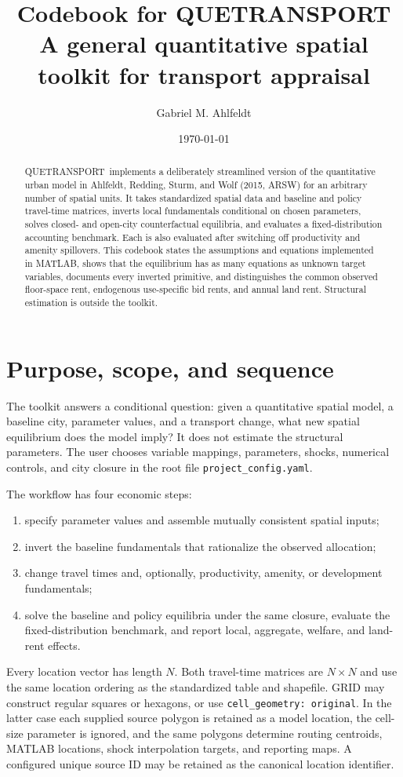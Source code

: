 \documentclass[11pt,a4paper]{article}
\title{\textbf{Codebook for QUETRANSPORT}\\
\large A general quantitative spatial toolkit for transport appraisal}
\author{Gabriel M. Ahlfeldt}
\date{\today}
\newcommand{\qt}{\textsc{QUETRANSPORT}}
\begin{document}
\maketitle
\begin{abstract}
\qt\ implements a deliberately streamlined version of the quantitative urban
model in Ahlfeldt, Redding, Sturm, and Wolf (2015, ARSW) for an arbitrary
number of spatial units. It takes standardized spatial data and baseline and
policy travel-time matrices, inverts local fundamentals conditional on chosen
parameters, solves closed- and open-city counterfactual equilibria, and
evaluates a fixed-distribution accounting benchmark. Each is also evaluated
after switching off productivity and amenity spillovers. This
codebook states the assumptions and equations implemented in MATLAB, shows
that the equilibrium has as many equations as unknown target variables,
documents every inverted primitive, and distinguishes the common observed
floor-space rent, endogenous use-specific bid rents, and annual land rent.
Structural estimation is outside the toolkit.
\end{abstract}
\tableofcontents
\newpage

\section{Purpose, scope, and sequence}
The toolkit answers a conditional question: given a quantitative spatial model,
a baseline city, parameter values, and a transport change, what new spatial
equilibrium does the model imply? It does not estimate the structural
parameters. The user chooses variable mappings, parameters, shocks, numerical
controls, and city closure in the root file \texttt{project\_config.yaml}.

The workflow has four economic steps:
\begin{enumerate}
\item specify parameter values and assemble mutually consistent spatial inputs;
\item invert the baseline fundamentals that rationalize the observed allocation;
\item change travel times and, optionally, productivity, amenity, or development
fundamentals;
\item solve the baseline and policy equilibria under the same closure, evaluate
the fixed-distribution benchmark, and report local, aggregate, welfare, and
land-rent effects.
\end{enumerate}
Every location vector has length $N$. Both travel-time matrices are
$N\times N$ and use the same location ordering as the standardized table and
shapefile. GRID may construct regular squares or hexagons, or use
\texttt{cell\_geometry: original}. In the latter case each supplied source
polygon is retained as a model location, the cell-size parameter is ignored,
and the same polygons determine routing centroids, MATLAB locations, shock
interpolation targets, and reporting maps. A configured unique source ID may
be retained as the canonical location identifier.
\end{document}
